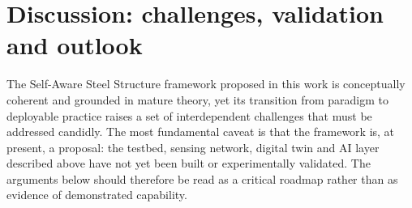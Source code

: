 \section{Discussion: challenges, validation and outlook}\label{sec:discussion}

The Self-Aware Steel Structure framework proposed in this work is conceptually coherent and grounded in mature theory, yet its transition from paradigm to deployable practice raises a set of interdependent challenges that must be addressed candidly. The most fundamental caveat is that the framework is, at present, a proposal: the testbed, sensing network, digital twin and AI layer described above have not yet been built or experimentally validated. The arguments below should therefore be read as a critical roadmap rather than as evidence of demonstrated capability.


